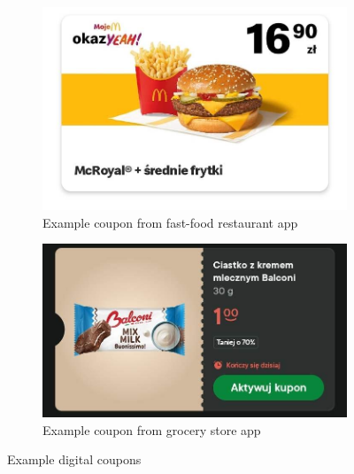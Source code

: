 \documentclass[licencjacka,en]{pracamgr}
\begin{document}
\begin{figure}[ht]
    \centering
    \begin{subfigure}[b]{0.45\textwidth}
        \centering
        \includegraphics[width=\textwidth]{bachelor_images/coupon1.jpg}
        \caption{Example coupon from fast-food restaurant app}
        \label{fig:coupon1}
    \end{subfigure}
    \hfill
    \begin{subfigure}[b]{0.45\textwidth}
        \centering
        \includegraphics[width=\textwidth]{bachelor_images/coupon2.jpg}
        \caption{Example coupon from grocery store app}
        \label{fig:coupon2}
    \end{subfigure}
    \caption{Example digital coupons}
    \label{fig:example_coupons}
\end{figure}
\end{document}
